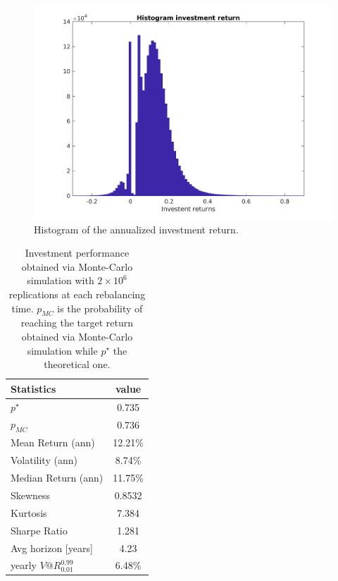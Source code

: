 \begin{figure}[H]
	\centering
	\includegraphics[scale = 0.4]{Images/DensityHistbasic}
	\caption{Histogram of the annualized investment return.}
	\label{fig:empirical density_basic}
\end{figure}

\begin{table}[H]
	\centering
	\begin{tabular}{@{}lc@{}}
		\toprule
		Statistics & value  \\
		\midrule
		$p^{\star}$ & 0.735\\
		\addlinespace[0.5em]	
		$p_{MC}$ & 0.736\\
		\addlinespace[0.5em]
		Mean Return (ann) & 12.21\%\\
		\addlinespace[0.5em]
		Volatility (ann) & 8.74\%\\
		\addlinespace[0.5em]
		Median Return (ann) & 11.75\%\\
		\addlinespace[0.5em]
		Skewness & 0.8532\\
		\addlinespace[0.5em]
		Kurtosis & 7.384\\
		\addlinespace[0.5em]
		Sharpe Ratio & 1.281\\
		\addlinespace[0.5em]
		Avg horizon [years] & 4.23 \\
		\addlinespace[0.5em]
		yearly $V@R^{0.99}_{0.01}$ & 6.48\%\\	
		\bottomrule
	\end{tabular}
	\caption{Investment performance obtained via Monte-Carlo simulation with $2\times10^6$ replications at each rebalancing time. $p_{MC}$ is the probability of reaching the target return obtained via Monte-Carlo simulation while $p^{\star}$ the theoretical one.}
	\label{tab:performance_basic}
\end{table}
